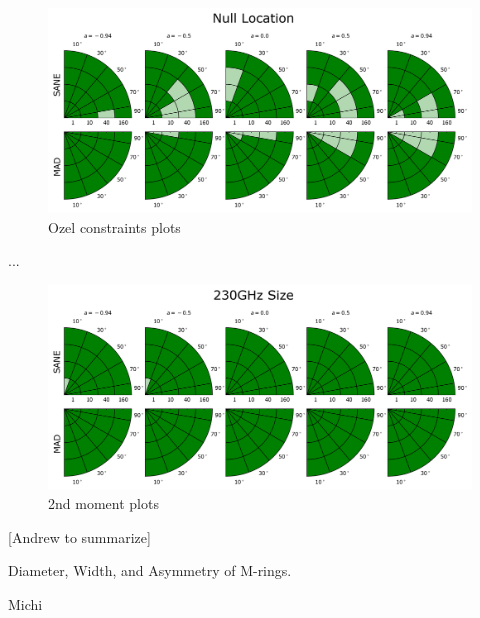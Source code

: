 \begin{figure}
  \centering
  \includegraphics[width=\columnwidth]{./figures/Ozel.png}
  \caption{Ozel constraints plots}
  \label{fig:cmp_ozel}
\end{figure}

...


\begin{figure}
  \centering
  \includegraphics[width=\columnwidth]{./figures/230GHz_size.png}
  \caption{2nd moment plots}
  \label{fig:cmp_2nd_moment}
\end{figure}

[Andrew to summarize]


Diameter, Width, and Asymmetry of M-rings.

Michi

